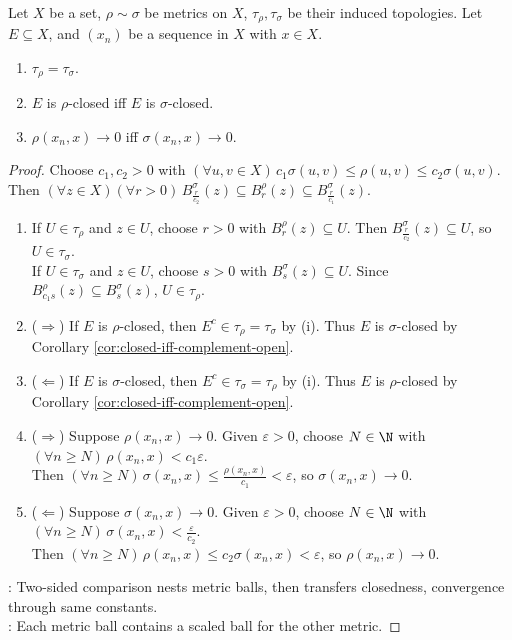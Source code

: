 \begin{proposition} \label{prop:equivalent-metrics-preserve-tests} \\
Let $X$ be a set, $\rho\sim\sigma$ be metrics on $X$, $\tau_\rho,\tau_\sigma$ be their induced topologies. Let $E\subseteq X$, and $(x_n)$ be a sequence in $X$ with $x\in X$.
\begin{enumerate}[label=(\roman*)]
\setlength{\itemsep}{0pt}
\item $\tau_\rho=\tau_\sigma$.
\item $E$ is $\rho$-closed iff $E$ is $\sigma$-closed.
\item $\rho(x_n,x)\to0$ iff $\sigma(x_n,x)\to0$.
\end{enumerate}
\begin{proof}
Choose $c_1,c_2>0$ with $(\forall u,v\in X)\,c_1\sigma(u,v)\leq\rho(u,v)\leq c_2\sigma(u,v)$. Then $(\forall z\in X)(\forall r>0)\,B_{\frac{r}{c_2}}^\sigma(z)\subseteq B_r^\rho(z)\subseteq B_{\frac{r}{c_1}}^\sigma(z)$.
\begin{enumerate}[label=(\roman*)]
\setlength{\itemsep}{0pt}
\item[$(i)$] If $U\in\tau_\rho$ and $z\in U$, choose $r>0$ with $B_r^\rho(z)\subseteq U$. Then $B_{\frac{r}{c_2}}^\sigma(z)\subseteq U$, so $U\in\tau_\sigma$.\\
If $U\in\tau_\sigma$ and $z\in U$, choose $s>0$ with $B_s^\sigma(z)\subseteq U$. Since $B_{c_1s}^\rho(z)\subseteq B_s^\sigma(z)$, $U\in\tau_\rho$.
\item[$(ii)$] ($\Rightarrow$) If $E$ is $\rho$-closed, then $E^c\in\tau_\rho=\tau_\sigma$ by (i). Thus $E$ is $\sigma$-closed by Corollary \ref{cor:closed-iff-complement-open}.
\item[$(ii)$] ($\Leftarrow$) If $E$ is $\sigma$-closed, then $E^c\in\tau_\sigma=\tau_\rho$ by (i). Thus $E$ is $\rho$-closed by Corollary \ref{cor:closed-iff-complement-open}.
\item[$(iii)$] ($\Rightarrow$) Suppose $\rho(x_n,x)\to0$. Given $\varepsilon>0$, choose $N\in\N$ with $(\forall n\geq N)\,\rho(x_n,x)<c_1\varepsilon$.\\
Then $(\forall n\geq N)\,\sigma(x_n,x)\leq\frac{\rho(x_n,x)}{c_1}<\varepsilon$, so $\sigma(x_n,x)\to0$.
\item[$(iii)$] ($\Leftarrow$) Suppose $\sigma(x_n,x)\to0$. Given $\varepsilon>0$, choose $N\in\N$ with $(\forall n\geq N)\,\sigma(x_n,x)<\frac{\varepsilon}{c_2}$.\\
Then $(\forall n\geq N)\,\rho(x_n,x)\leq c_2\sigma(x_n,x)<\varepsilon$, so $\rho(x_n,x)\to0$.
\end{enumerate}
: Two-sided comparison nests metric balls, then transfers closedness, convergence through same constants.\\
: Each metric ball contains a scaled ball for the other metric.
\end{proof}
\end{proposition}

